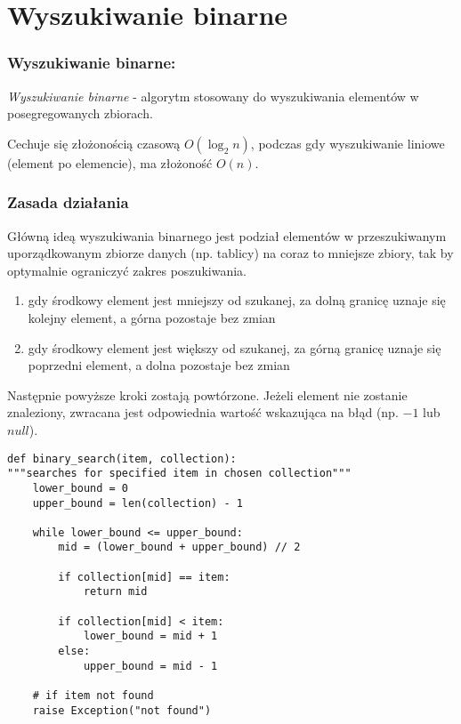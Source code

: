 \documentclass{beamer}
\begin{document}
\section{Wyszukiwanie binarne}
\begin{frame}
    \frametitle{Wyszukiwanie binarne:}
    \emph{Wyszukiwanie binarne} - algorytm stosowany do wyszukiwania
    elementów w posegregowanych zbiorach.

    Cechuje się złożonością czasową $O \left(\log_2 n \right)$, podczas gdy wyszukiwanie liniowe (element po elemencie), ma złożoność $O \left( n \right)$.

   
\end{frame}

\begin{frame}
    \frametitle{Zasada działania}
    Główną ideą wyszukiwania binarnego jest podział elementów w przeszukiwanym uporządkowanym zbiorze danych
    (np. tablicy) na coraz to mniejsze zbiory, tak by optymalnie ograniczyć zakres poszukiwania.

    \begin{enumerate}
        \item gdy środkowy element jest mniejszy od szukanej, za dolną granicę uznaje się kolejny element, a górna pozostaje bez zmian
        \item gdy środkowy element jest większy od szukanej, za górną granicę uznaje się poprzedni element,
              a dolna pozostaje bez zmian
    \end{enumerate}

    Następnie powyższe kroki zostają powtórzone. Jeżeli element nie zostanie znaleziony,
    zwracana jest odpowiednia wartość wskazująca na błąd (np. $-1$ lub $null$).
\end{frame}

\begin{verbatim}
def binary_search(item, collection):
"""searches for specified item in chosen collection"""
    lower_bound = 0
    upper_bound = len(collection) - 1

    while lower_bound <= upper_bound:
        mid = (lower_bound + upper_bound) // 2

        if collection[mid] == item:
            return mid

        if collection[mid] < item:
            lower_bound = mid + 1
        else:
            upper_bound = mid - 1

    # if item not found
    raise Exception("not found")
\end{verbatim}
\end{document}
